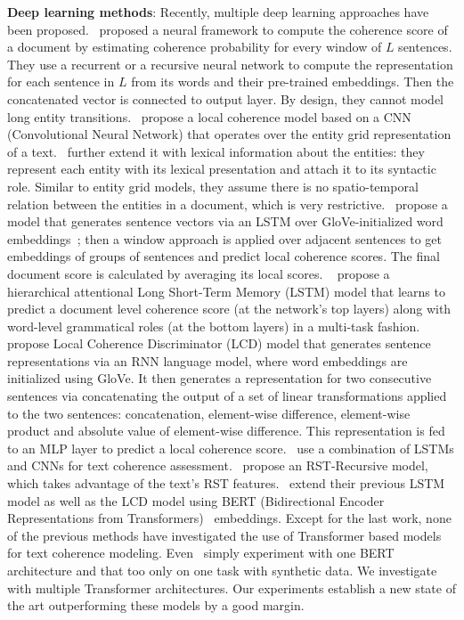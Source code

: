 \documentclass[11pt]{article}
\begin{document}
\noindent\textbf{Deep learning methods}: Recently, multiple deep learning approaches have been proposed.~\cite{li2014model} proposed a neural framework to compute the coherence score of a document by estimating coherence probability for every window of $L$ sentences. They use a recurrent or a recursive neural network to compute the representation for each sentence in $L$ from its words and their pre-trained embeddings. Then the concatenated vector is connected to output layer. By design, they cannot model long entity transitions.~\cite{nguyen2017neural} propose a local coherence model based on a CNN (Convolutional Neural Network) that operates over the entity grid representation of a text.~\cite{mohiuddin2018coherence} further extend it with lexical information about the entities: they represent each entity with its lexical presentation and attach it to its syntactic role. Similar to entity grid models, they assume there is no spatio-temporal relation between the entities in a document, which is very restrictive.~\cite{li2017neural} propose a model that generates sentence vectors via an LSTM over GloVe-initialized word embeddings~\cite{pennington2014glove}; then a window approach is applied over adjacent sentences to get embeddings of groups of sentences and predict local coherence scores. The final document score is calculated by averaging its local scores. 
~\cite{farag2019multi} propose a hierarchical attentional Long Short-Term Memory (LSTM) model that learns to predict a document level coherence score (at the network’s top layers) along with word-level grammatical roles (at the bottom layers) in a multi-task fashion. 
~\cite{xu2019cross} propose Local Coherence Discriminator (LCD) model that generates sentence representations via an RNN language model, where word embeddings are initialized using GloVe. It then generates a representation for two consecutive sentences via concatenating the output of a set of linear transformations applied to the two sentences: concatenation, element-wise difference, element-wise product and absolute value of element-wise difference. This representation is fed to an MLP layer to predict a local coherence score.~\cite{moon2019unified} use a combination of LSTMs and CNNs for text coherence assessment.~\cite{guz2020neural} propose an RST-Recursive model, which takes advantage of the text's RST features.~\cite{farag2020analyzing} extend their previous LSTM model as well as the LCD model using BERT (Bidirectional Encoder Representations from Transformers)~\cite{devlin2018bert} embeddings. Except for the last work, none of the previous methods have investigated the use of Transformer based models for text coherence modeling. Even~\cite{farag2020analyzing} simply experiment with one BERT architecture and that too only on one task with synthetic data. We investigate with multiple Transformer architectures. Our experiments establish a new state of the art outperforming these models by a good margin.
\fi
\end{document}
